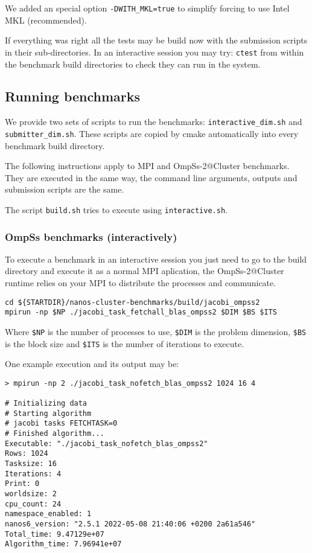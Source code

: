\documentclass{article}
\newcommand{\code}[1]{\texttt{#1}}
\begin{document}
We added an special option \code{-DWITH\_MKL=true} to simplify forcing
to use Intel MKL (recommended).

If everything was right all the tests may be build now with the
submission scripts in their sub-directories. In an interactive session
you may try: \code{ctest} from within the benchmark build directories
to check they can run in the system.

\subsection{Running benchmarks}

We provide two sets of scripts to run the benchmarks:
\code{interactive\_dim.sh} and \code{submitter\_dim.sh}. These scripts
are copied by cmake automatically into every benchmark build
directory.

The following instructions apply to MPI and OmpSs-2@Cluster
benchmarks.  They are executed in the same way, the command line
arguments, outputs and submission scripts are the same.

The script \code{build.sh} tries to execute using
\code{interactive.sh}.

\subsubsection{OmpSs benchmarks (interactively)}
To execute a benchmark in an interactive session you just need to go
to the build directory and execute it as a normal MPI aplication, the
OmpSs-2@Cluster runtime relies on your MPI to distribute the processes
and communicate.

\begin{lstlisting}
cd ${STARTDIR}/nanos-cluster-benchmarks/build/jacobi_ompss2
mpirun -np $NP ./jacobi_task_fetchall_blas_ompss2 $DIM $BS $ITS
\end{lstlisting}

Where \code{\$NP} is the number of processes to use, \code{\$DIM} is the
problem dimension, \code{\$BS} is the block size and \code{\$ITS} is the
number of iterations to execute.

One example execution and its output may be:
\begin{lstlisting}
> mpirun -np 2 ./jacobi_task_nofetch_blas_ompss2 1024 16 4

# Initializing data
# Starting algorithm
# jacobi tasks FETCHTASK=0
# Finished algorithm...
Executable: "./jacobi_task_nofetch_blas_ompss2"
Rows: 1024
Tasksize: 16
Iterations: 4
Print: 0
worldsize: 2
cpu_count: 24
namespace_enabled: 1
nanos6_version: "2.5.1 2022-05-08 21:40:06 +0200 2a61a546"
Total_time: 9.47129e+07
Algorithm_time: 7.96941e+07
\end{lstlisting}
\end{document}

